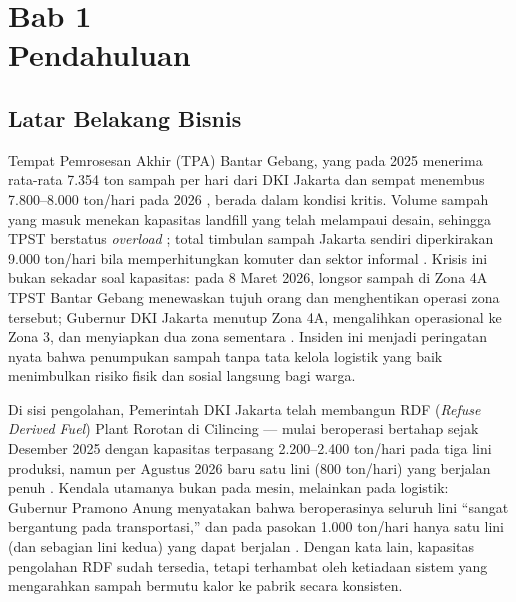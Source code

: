 \section{Bab 1\\Pendahuluan}

\subsection{Latar Belakang Bisnis}
\label{sec:1-1}

Tempat Pemrosesan Akhir (TPA) Bantar Gebang, yang pada 2025 menerima rata-rata \textpm{}7.354 ton sampah per hari dari DKI Jakarta dan sempat menembus \textpm{}7.800--8.000 ton/hari pada 2026 \parencite{dlhjakarta2026,bbcindonesia2026}, berada dalam kondisi kritis. Volume sampah yang masuk menekan kapasitas landfill yang telah melampaui desain, sehingga TPST berstatus \textit{overload} \parencite{koranjakarta2025}; total timbulan sampah Jakarta sendiri diperkirakan \textpm{}9.000 ton/hari bila memperhitungkan komuter dan sektor informal \parencite{kompaspunya2026}. Krisis ini bukan sekadar soal kapasitas: pada 8 Maret 2026, longsor sampah di Zona 4A TPST Bantar Gebang menewaskan tujuh orang dan menghentikan operasi zona tersebut; Gubernur DKI Jakarta menutup Zona 4A, mengalihkan operasional ke Zona 3, dan menyiapkan dua zona sementara \parencite{bbcindonesia2026}. Insiden ini menjadi peringatan nyata bahwa penumpukan sampah tanpa tata kelola logistik yang baik menimbulkan risiko fisik dan sosial langsung bagi warga.

Di sisi pengolahan, Pemerintah DKI Jakarta telah membangun RDF (\textit{Refuse Derived Fuel}) Plant Rorotan di Cilincing --- mulai beroperasi bertahap sejak Desember 2025 dengan kapasitas terpasang 2.200--2.400 ton/hari pada tiga lini produksi, namun per Agustus 2026 baru satu lini (\textpm{}800 ton/hari) yang berjalan penuh \parencite{rorotan2026}. Kendala utamanya bukan pada mesin, melainkan pada logistik: Gubernur Pramono Anung menyatakan bahwa beroperasinya seluruh lini ``sangat bergantung pada transportasi,'' dan pada pasokan \textpm{}1.000 ton/hari hanya satu lini (dan sebagian lini kedua) yang dapat berjalan \parencite{kompasrorotan2026}. Dengan kata lain, kapasitas pengolahan RDF sudah tersedia, tetapi terhambat oleh ketiadaan sistem yang mengarahkan sampah bermutu kalor ke pabrik secara konsisten.

